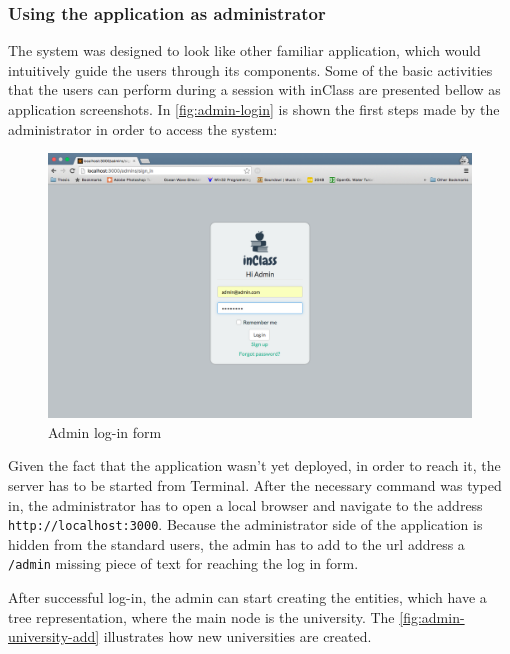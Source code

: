 \subsubsection{Using the application as administrator}
The system was designed to look like other familiar application, which would intuitively guide the users through its components. Some of the basic activities that the users can perform during a session with inClass are presented bellow as application screenshots. In \autoref{fig:admin-login} is shown the first steps made by the administrator in order to access the system:

\begin{figure}[H]
\centering
\includegraphics[width=14cm]{Chapter3/admin-login.png}
\caption{Admin log-in form}
\label{fig:admin-login}
\end{figure}

Given the fact that the application wasn't yet deployed, in order to reach it, the server has to be started from Terminal. After the necessary command was typed in, the administrator has to open a local browser and navigate to the address \texttt{http://localhost:3000}. Because the administrator side of the application is hidden from the standard users, the admin has to add to the url address a \texttt{/admin} missing piece of text for reaching the log in form.

After successful log-in, the admin can start creating the entities, which have a tree representation, where the main node is the university. The \autoref{fig:admin-university-add} illustrates how new universities are created.

